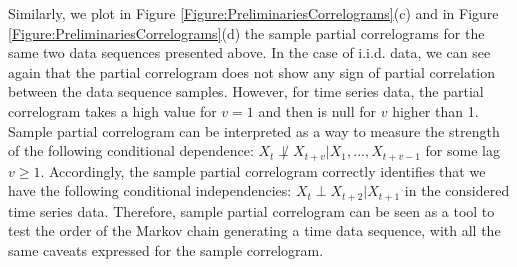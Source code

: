 Similarly, we plot in Figure \ref{Figure:PreliminariesCorrelograms}(c) and  in  Figure \ref{Figure:PreliminariesCorrelograms}(d) the sample partial correlograms for the same two data sequences presented above. In the case of i.i.d. data, we can see again that the partial correlogram does not show any sign of partial correlation between the data sequence samples. However, for time series data, the partial correlogram takes a high value for $v=1$ and then is null for $v$ higher than 1. Sample partial correlogram can be interpreted as a way to measure the strength of the following conditional dependence: $X_t  \not\perp X_{t+v} | X_1,...,X_{t+v-1}$ for some lag $v\geq 1$.  Accordingly, the sample partial correlogram correctly identifies that we have the following conditional independencies: $X_t\perp X_{t+2}|X_{t+1}$ in the considered time series data. Therefore, sample partial correlogram can be seen as a tool to test the order of the Markov chain generating a time data sequence, with all the same caveats expressed for the sample correlogram. 


